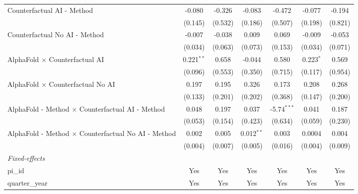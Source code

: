 \begin{tabular}{lcccccc}
   Counterfactual AI - Method                                 & -0.080         & -0.326  & -0.083       & -0.472        & -0.077       & -0.194\\   
                                                              & (0.145)        & (0.532) & (0.186)      & (0.507)       & (0.198)      & (0.821)\\   
   Counterfactual No AI - Method                              & -0.007         & -0.038  & 0.009        & 0.069         & -0.009       & -0.053\\   
                                                              & (0.034)        & (0.063) & (0.073)      & (0.153)       & (0.034)      & (0.071)\\   
   AlphaFold $\times$ Counterfactual AI                       & 0.221$^{**}$   & 0.658   & -0.044       & 0.580         & 0.223$^{*}$  & 0.569\\   
                                                              & (0.096)        & (0.553) & (0.350)      & (0.715)       & (0.117)      & (0.954)\\   
   AlphaFold $\times$ Counterfactual No AI                    & 0.197          & 0.195   & 0.326        & 0.173         & 0.208        & 0.268\\   
                                                              & (0.133)        & (0.201) & (0.202)      & (0.368)       & (0.147)      & (0.200)\\   
   AlphaFold - Method $\times$ Counterfactual AI - Method     & 0.048          & 0.197   & 0.037        & -5.74$^{***}$ & 0.041        & 0.187\\   
                                                              & (0.053)        & (0.154) & (0.423)      & (0.634)       & (0.059)      & (0.230)\\   
   AlphaFold - Method $\times$ Counterfactual No AI - Method  & 0.002          & 0.005   & 0.012$^{**}$ & 0.003         & 0.0004       & 0.004\\   
                                                              & (0.004)        & (0.007) & (0.005)      & (0.016)       & (0.004)      & (0.009)\\   
   \midrule
   \emph{Fixed-effects}\\
   pi\_id                                                     & Yes            & Yes     & Yes          & Yes           & Yes          & Yes\\  
   quarter\_year                                              & Yes            & Yes     & Yes          & Yes           & Yes          & Yes\\  

\end{tabular}
